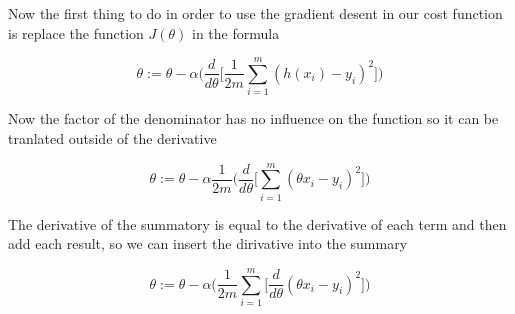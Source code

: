 \documentclass[12pt,journal]{IEEEtran}
\begin{document}

    Now the first thing to do in order to use the gradient desent in our cost
    function is replace the function $J(\theta)$ in the formula

    \begin{equation}
        \theta := \theta - \alpha
            \Bigg(
                \frac{d}{d \theta}
                    \Bigg[
                        \frac{1}{2m} \sum_{i=1}^{m} ( h(x_i) - y_i )^2
                    \Bigg]
            \Bigg)
    \end{equation}

    Now the factor of the denominator has no influence on the function so it
    can be tranlated outside of the derivative

    \begin{equation}
        \theta := \theta - \alpha \frac{1}{2m}
            \Bigg(
                \frac{d}{d \theta}
                    \Bigg[
                        \sum_{i=1}^{m} (\theta x_i - y_i)^2
                    \Bigg]
            \Bigg)
    \end{equation}

    The derivative of the summatory is equal to the derivative of each term and
    then add each result, so we can insert the dirivative into the summary

    \begin{equation}
        \theta := \theta - \alpha
            \Bigg(
                \frac{1}{2m} \sum_{i=1}^{m}
                    \Bigg[
                        \frac{d}{d \theta} (\theta x_i - y_i)^2
                    \Bigg]
            \Bigg)
    \end{equation}
\end{document}
